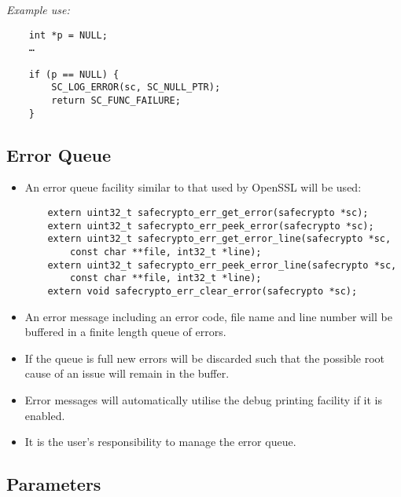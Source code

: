 \vspace{1em}
\textit{Example use:}

\indent\begin{verbatim}
    int *p = NULL;
    …

    if (p == NULL) {
        SC_LOG_ERROR(sc, SC_NULL_PTR);
        return SC_FUNC_FAILURE;
    }
\end{verbatim}


\subsection{Error Queue}

\begin{itemize}
\item An error queue facility similar to that used by OpenSSL will be used:

\begin{verbatim}
    extern uint32_t safecrypto_err_get_error(safecrypto *sc);
    extern uint32_t safecrypto_err_peek_error(safecrypto *sc);
    extern uint32_t safecrypto_err_get_error_line(safecrypto *sc,
        const char **file, int32_t *line);
    extern uint32_t safecrypto_err_peek_error_line(safecrypto *sc,
        const char **file, int32_t *line);
    extern void safecrypto_err_clear_error(safecrypto *sc);
\end{verbatim}

\item An error message including an error code, file name and line number will be buffered in a finite length queue of errors.
\item If the queue is full new errors will be discarded such that the possible root cause of an issue will remain in the buffer.
\item Error messages will automatically utilise the debug printing facility if it is enabled.
\item It is the user’s responsibility to manage the error queue.
\end{itemize}

\subsection{Parameters}

